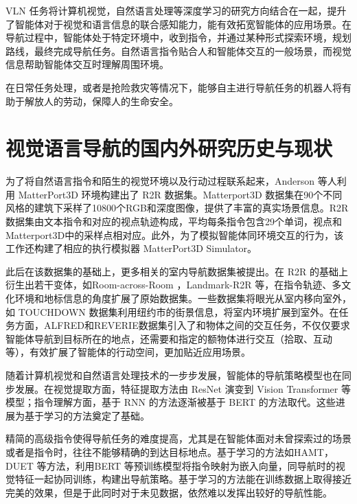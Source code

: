 \documentclass[bachelor]{thesis-uestc}
\begin{document}
VLN 任务将计算机视觉，自然语言处理等深度学习的研究方向结合在一起，提升了智能体对于视觉和语言信息的联合感知能力，能有效拓宽智能体的应用场景。在导航过程中，智能体处于特定环境中，收到指令，并通过某种形式探索环境，规划路线，最终完成导航任务。自然语言指令贴合人和智能体交互的一般场景，而视觉信息帮助智能体交互时理解周围环境。

在日常任务处理，或者是抢险救灾等情况下，能够自主进行导航任务的机器人将有助于解放人的劳动，保障人的生命安全。


\section{视觉语言导航的国内外研究历史与现状}
为了将自然语言指令和陌生的视觉环境以及行动过程联系起来，Anderson 等人\cite{anderson2018visionandlanguage}利用 MatterPort3D 环境构建出了 R2R 数据集。Matterport3D 数据集在90个不同风格的建筑下采样了10800个RGB和深度图像，提供了丰富的真实场景信息。R2R 数据集由文本指令和对应的视点轨迹构成，平均每条指令包含29个单词，视点和Matterport3D\cite{changMatterport3DLearningRGBD2017}中的采样点相对应。此外，为了模拟智能体同环境交互的行为，该工作还构建了相应的执行模拟器 MatterPort3D Simulator。

此后在该数据集的基础上，更多相关的室内导航数据集被提出。在 R2R 的基础上衍生出若干变体，如Room-across-Room \cite{ku2020roomacrossroom}，Landmark-R2R \cite{heLandmarkRxRSolvingVisionandLanguage2021}等，在指令轨迹、多文化环境和地标信息的角度扩展了原始数据集。一些数据集将眼光从室内移向室外，如 TOUCHDOWN 数据集\cite{chenTOUCHDOWNNaturalLanguage2019}利用纽约市的街景信息，将室内环境扩展到室外。在任务方面，ALFRED\cite{shridharALFREDBenchmarkInterpreting2020}和REVERIE\cite{qiREVERIERemoteEmbodied2020}数据集引入了和物体之间的交互任务，不仅仅要求智能体导航到目标所在的地点，还需要和指定的额物体进行交互（拾取、互动等），有效扩展了智能体的行动空间，更加贴近应用场景。

随着计算机视觉和自然语言处理技术的一步步发展，智能体的导航策略模型也在同步发展。在视觉提取方面，特征提取方法由 ResNet\cite{he2015deep} 演变到 Vision Transformer\cite{dosovitskiyImageWorth16x162021} 等模型；指令理解方面，基于 RNN\cite{Sherstinsky_2020} 的方法逐渐被基于 BERT\cite{devlinBERTPretrainingDeep2019} 的方法取代。这些进展为基于学习的方法奠定了基础。

精简的高级指令使得导航任务的难度提高，尤其是在智能体面对未曾探索过的场景或者是指令时，往往不能够精确的到达目标地点。基于学习的方法如HAMT\cite{chen2021history}，DUET\cite{chenThinkGlobalAct2022} 等方法，利用BERT\cite{devlinBERTPretrainingDeep2019} 等预训练模型将指令映射为嵌入向量，同导航时的视觉特征一起协同训练，构建出导航策略。基于学习的方法能在训练数据上取得接近完美的效果，但是于此同时对于未见数据，依然难以发挥出较好的导航性能。
\end{document}
